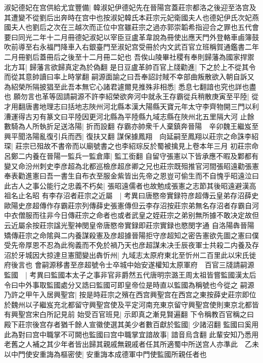 淑妃德妃在宫供給尤宜豐備|{
	韓淑妃伊德妃先在晉陽宫蓋莊宗都洛之後迎至洛宫及其遭變不從劉后出奔時在宫中也按淑妃韓氏本莊宗元妃衛國夫人也德妃伊氏次妃燕國夫人也劉后之次在三越次而正位中宫雖莊宗之過亦郭崇韜希指迎合之罪也五代會要曰同光二年十二月冊德妃淑妃以宰臣豆盧革韋說為冊使出應天門外登輅車鹵簿鼓吹前導至右永福門降車入右銀臺門至淑妃宫受冊於内文武百官立班稱賀通鑑書二年二月冊劉后蓋冊后之後至十二月冊二妃也}
吾俟山陵畢社稷有奉則歸藩為國家捍禦北方耳|{
	歸藩言欲歸真定為於偽翻}
是日豆盧革帥百官上牋勸進|{
	下之於上不從其令而從其意帥讀曰率上時掌翻}
嗣源面諭之曰吾奉詔討賊不幸部曲叛散欲入朝自訴又為紹榮所隔披猖至此吾本無它心諸君遽爾見推殊非相悉|{
	悉息七翻諳也究也詳也盡也}
願勿言也革等固請嗣源不許李紹榮欲奔河中就永王存霸從兵稍散庚寅至平陸|{
	從才用翻唐書地理志曰括地志陜州河北縣本漢大陽縣天寶元年太守李齊物開三門以利漕運得古刃有篆文曰平陸因更河北縣為平陸縣九域志縣在陜州北五里隔大河}
止餘數騎為人所執折足送洛陽|{
	折而設翻}
存霸亦帥衆千人棄鎮奔晉陽　辛卯魏王繼岌至興平聞洛陽亂復引兵而西|{
	復扶又翻}
謀保據鳳翔　向延嗣至鳳翔以莊宗之命誅李紹琛|{
	莊宗已殂故不書帝而以廟號書之也李紹琮反於蜀被擒見上卷本年三月}
初莊宗命呂鄭二内養在晉陽一監兵一監倉庫|{
	監工銜翻}
自留守張憲以下皆承應不暇及鄴都有變又命汾州刺史李彦超為北都巡檢彦超彦卿之兄也莊宗既殂推官河間張昭遠勸張憲奉表勸進憲曰吾一書生自布衣至服金紫皆出先帝之恩豈可偷生而不自愧乎昭遠泣曰此古人之事公能行之忠義不朽矣|{
	張昭遠儒者也故勉成張憲之志節其後昭遠避漢高祖名止名昭}
有李存沼者莊宗之近屬　|{
	考異曰唐愍帝實録符彦超傳云皇弟存沼薛史歐陽史彦超傳作存霸莊宗列傳薛史張憲傳但云李存沼按莊宗弟無名存沼者存霸自河中衣僧服而往非今日傳莊宗之命者也或者武皇之姪莊宗之弟别無所據不敢决定故但云近屬余按莊宗諡光聖神閔皇帝唐愍帝實録即莊宗實録也愍閔字通}
自洛陽犇晉陽矯傳莊宗之命隂與二内養謀殺憲及彦超據晉陽拒守彦超知之密告憲欲先圖之憲曰僕受先帝厚恩不忍為此徇義而不免於禍乃天也彦超謀未决壬辰夜軍士共殺二内養及存沼於牙城因大掠達旦憲聞變出犇忻州|{
	九域志太原府東北至忻州二百里此以宋氏徙府後言也}
會嗣源移書至彦超號令士卒城中始安遂權知太原軍府　百官三牋請嗣源監國　|{
	考異曰監國本太子之事非官非爵然五代唐明宗潞王周太祖皆嘗監國漢太后令曰中外事取監國處分又誥曰監國可即皇帝位是時直以監國為稱號也今從之}
嗣源乃許之甲午入居興聖宫|{
	按是時莊宗之殯在西宫興聖宫在西宫之東按薛史莊宗即位於魏州以子繼岌充北都留守興聖宫使及平定河南充東京留守興聖宫使則東京北都皆有興聖宫宋白所記見前}
始受百官班見|{
	示即真之漸見賢遍翻}
下令稱教百官稱之曰殿下莊宗後宫存者猶千餘人宣徽使選其美少者數百獻於監國|{
	少諸沼翻}
監國曰奚用此為對曰宫中職掌不可闕也監國曰宫中職掌宜諳故事|{
	諳音烏含翻}
此輩安知乃悉用老舊之人補之其少年者皆出歸其親戚無親戚者任其所適蜀中所送宫人亦準此　乙未以中門使安重誨為樞密使|{
	安重誨本成德軍中門使監國所親任者也}

